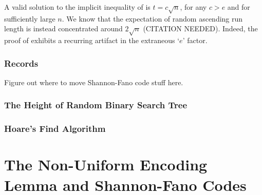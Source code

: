 \documentclass{patmorin}
\begin{document}
\begin{rem}
  A valid solution to the implicit inequality of  is
  $t = c \sqrt{n}$, for any $c > e$ and for sufficiently large $n$. We
  know that the expectation of random ascending run length is instead
  concentrated around $2 \sqrt{n}$ (CITATION NEEDED). Indeed, the
  proof of  exhibits a recurring artifact in the
  extraneous `$e$' factor.
\end{rem}

\subsubsection{Records}

Figure out where to move Shannon-Fano code stuff here.  



%
%

\subsubsection{The Height of Random Binary Search Tree}

\subsubsection{Hoare's Find Algorithm}


\section{The Non-Uniform Encoding Lemma and Shannon-Fano Codes}
\end{document}
